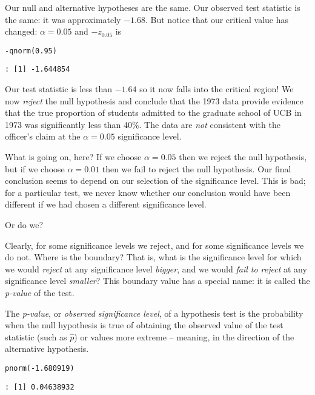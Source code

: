 Our null and alternative hypotheses are the same. Our observed test
statistic is the same: it was approximately \(-1.68\). But notice that
our critical value has changed: \(\alpha = 0.05\) and \(-z_{0.05}\) is

\begin{verbatim}
-qnorm(0.95)
\end{verbatim}

\begin{verbatim}
: [1] -1.644854
\end{verbatim}

Our test statistic is less than \(-1.64\) so it now falls into the
critical region! We now \emph{reject} the null hypothesis and conclude that
the 1973 data provide evidence that the true proportion of students
admitted to the graduate school of UCB in 1973 was significantly less
than 40\%. The data are \emph{not} consistent with the officer's claim at
the \(\alpha = 0.05\) significance level.

What is going on, here? If we choose \(\alpha = 0.05\) then we reject
the null hypothesis, but if we choose \(\alpha = 0.01\) then we fail
to reject the null hypothesis. Our final conclusion seems to depend on
our selection of the significance level. This is bad; for a particular
test, we never know whether our conclusion would have been different
if we had chosen a different significance level.

Or do we?

Clearly, for some significance levels we reject, and for some
significance levels we do not. Where is the boundary? That is, what is
the significance level for which we would \emph{reject} at any significance
level \emph{bigger}, and we would \emph{fail to reject} at any significance
level \emph{smaller}? This boundary value has a special name: it is called
the \emph{p-value} of the test.

\begin{defn}
The \emph{p-value}, or \emph{observed significance level}, of a hypothesis test
is the probability when the null hypothesis is true of obtaining the
observed value of the test statistic (such as \(\hat{p}\)) or values
more extreme -- meaning, in the direction of the alternative
hypothesis.
\end{defn}

\begin{verbatim}
pnorm(-1.680919)
\end{verbatim}

\begin{verbatim}
: [1] 0.04638932
\end{verbatim}


